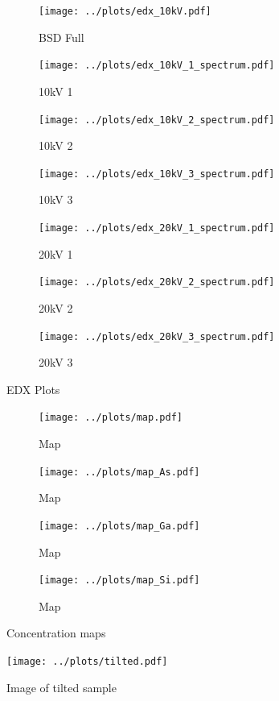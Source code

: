 \begin{figure}
	\centering
	\begin{subfigure}{0.7\linewidth}
		\centering
		\texttt{[image: ../plots/edx\_10kV.pdf]}
		\caption{BSD Full}
		\label{subfig:edx_spots}
	\end{subfigure}
	\begin{subfigure}{0.45\linewidth}
		\centering
		\texttt{[image: ../plots/edx\_10kV\_1\_spectrum.pdf]}
		\caption{10kV 1}
		\label{subfig:10kV_1_spectrum}
	\end{subfigure}
	\begin{subfigure}{0.45\linewidth}
		\centering
		\texttt{[image: ../plots/edx\_10kV\_2\_spectrum.pdf]}
		\caption{10kV 2}
		\label{subfig:10kV_2_spectrum}
	\end{subfigure}
	\begin{subfigure}{0.45\linewidth}
		\centering
		\texttt{[image: ../plots/edx\_10kV\_3\_spectrum.pdf]}
		\caption{10kV 3}
		\label{subfig:10kV_3_spectrum}
	\end{subfigure}
	\begin{subfigure}{0.45\linewidth}
		\centering
		\texttt{[image: ../plots/edx\_20kV\_1\_spectrum.pdf]}
		\caption{20kV 1}
		\label{subfig:20kV_1_spectrum}
	\end{subfigure}
	\begin{subfigure}{0.45\linewidth}
		\centering
		\texttt{[image: ../plots/edx\_20kV\_2\_spectrum.pdf]}
		\caption{20kV 2}
		\label{subfig:20kV_2_spectrum}
	\end{subfigure}
	\begin{subfigure}{0.45\linewidth}
		\centering
		\texttt{[image: ../plots/edx\_20kV\_3\_spectrum.pdf]}
		\caption{20kV 3}
		\label{subfig:20kV_3_spectrum}
	\end{subfigure}
	\caption{EDX Plots}
	\label{fig:edx_plots}
\end{figure}

\begin{figure}[t!]
	\centering
	\begin{subfigure}{0.45\linewidth}
		\centering
		\texttt{[image: ../plots/map.pdf]}
		\caption{Map}
		\label{subfig:map_original}
	\end{subfigure}
	\begin{subfigure}{0.45\linewidth}
		\centering
		\texttt{[image: ../plots/map\_As.pdf]}
		\caption{Map }
		\label{subfig:map_as}
	\end{subfigure}
	\begin{subfigure}{0.45\linewidth}
		\centering
		\texttt{[image: ../plots/map\_Ga.pdf]}
		\caption{Map }
		\label{subfig:map_ga}
	\end{subfigure}
	\begin{subfigure}{0.45\linewidth}
		\centering
		\texttt{[image: ../plots/map\_Si.pdf]}
		\caption{Map }
		\label{subfig:map_si}
	\end{subfigure}
	\caption{Concentration maps}
	\label{fig:edx_maps}
\end{figure}

\begin{figure}[h]
	\centering
	\texttt{[image: ../plots/tilted.pdf]}
	\caption{Image of tilted sample}
	\label{fig:depth}
\end{figure}
